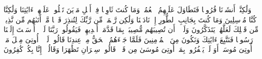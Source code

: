 \stopbuffer%
\startbuffer[\q:28:45]
وَلَٰكِنَّاۤ أَنشَأۡنَا قُرُونࣰا فَتَطَاوَلَ عَلَیۡهِمُ ٱلۡعُمُرُۚ وَمَا كُنتَ ثَاوِیࣰا فِیۤ أَهۡلِ مَدۡیَنَ تَتۡلُوا۟ عَلَیۡهِمۡ ءَایَٰتِنَا وَلَٰكِنَّا كُنَّا مُرۡسِلِینَ%
\stopbuffer%
\startbuffer[\q:28:46]
وَمَا كُنتَ بِجَانِبِ ٱلطُّورِ إِذۡ نَادَیۡنَا وَلَٰكِن رَّحۡمَةࣰ مِّن رَّبِّكَ لِتُنذِرَ قَوۡمࣰا مَّاۤ أَتَىٰهُم مِّن نَّذِیرࣲ مِّن قَبۡلِكَ لَعَلَّهُمۡ یَتَذَكَّرُونَ%
\stopbuffer%
\startbuffer[\q:28:47]
وَلَوۡلَاۤ أَن تُصِیبَهُم مُّصِیبَةُۢ بِمَا قَدَّمَتۡ أَیۡدِیهِمۡ فَیَقُولُوا۟ رَبَّنَا لَوۡلَاۤ أَرۡسَلۡتَ إِلَیۡنَا رَسُولࣰا فَنَتَّبِعَ ءَایَٰتِكَ وَنَكُونَ مِنَ ٱلۡمُؤۡمِنِینَ%
\stopbuffer%
\startbuffer[\q:28:48]
فَلَمَّا جَاۤءَهُمُ ٱلۡحَقُّ مِنۡ عِندِنَا قَالُوا۟ لَوۡلَاۤ أُوتِیَ مِثۡلَ مَاۤ أُوتِیَ مُوسَىٰۤۚ أَوَ لَمۡ یَكۡفُرُوا۟ بِمَاۤ أُوتِیَ مُوسَىٰ مِن قَبۡلُۖ قَالُوا۟ سِحۡرَانِ تَظَٰهَرَا وَقَالُوۤا۟ إِنَّا بِكُلࣲّ كَٰفِرُونَ%
\stopbuffer%
